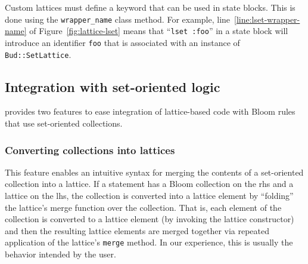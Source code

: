 


Custom lattices must define a keyword that can be used in \lang state
blocks. This is done using the \texttt{wrapper\_name} class method. For example,
line~\ref{line:lset-wrapper-name} of Figure~\ref{fig:lattice-lset} means that
``\texttt{lset :foo}'' in a state block will introduce an identifier
\texttt{foo} that is associated with an instance of \texttt{Bud::SetLattice}.

\subsection{Integration with set-oriented logic}
\label{sec:bloom-interop}
\lang provides two features to ease integration of lattice-based code with Bloom
rules that use set-oriented collections.

\subsubsection{Converting collections into lattices}
This feature enables an intuitive syntax for merging the contents of a
set-oriented collection into a lattice. If a statement has a Bloom collection on
the rhs and a lattice on the lhs, the collection is converted into a lattice
element by ``folding'' the lattice's merge function over the collection. That
is, each element of the collection is converted to a lattice element (by
invoking the lattice constructor) and then the resulting lattice elements are
merged together via repeated application of the lattice's \texttt{merge}
method. In our experience, this is usually the behavior intended by the user.

